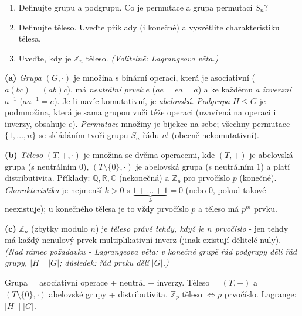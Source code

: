 \begin{zadani}
\begin{enumerate}[label=(\alph*)]
  \item {} Definujte grupu a podgrupu. Co je permutace a grupa permutací $S_n$?
  \item {} Definujte těleso. Uveďte příklady (i konečné) a vysvětlite charakteristiku tělesa.
  \item {} Uveďte, kdy je $\mathbb{Z}_n$ těleso. \emph{(Volitelně: Lagrangeova věta.)}
\end{enumerate}
\end{zadani}

\begin{reseni}
\textbf{(a)} \emph{Grupa} $(G,\cdot)$ je množina s binární operací, která je asociativní ($a(bc)=(ab)c$), má \emph{neutrální prvek} $e$ ($ae=ea=a$) a ke každému $a$ \emph{inverzní} $a^{-1}$ ($aa^{-1}=e$). Je-li navíc komutativní, je \emph{abelovská}. \emph{Podgrupa} $H\le G$ je podmnožina, která je sama grupou vuči téže operaci (uzavřená na operaci i inverzy, obsahuje $e$). \emph{Permutace} množiny je bijekce na sebe; všechny permutace $\{1,\dots,n\}$ se skládáním tvoří grupu $S_n$ řádu $n!$ (obecně nekomutativní).

\textbf{(b)} \emph{Těleso} $(T,+,\cdot)$ je množina se dvěma operacemi, kde $(T,+)$ je abelovská grupa (s neutrálním $0$), $(T\setminus\{0\},\cdot)$ je abelovská grupa (s neutrálním $1$) a platí distributivita. Příklady: $\mathbb{Q},\mathbb{R},\mathbb{C}$ (nekonečná) a $\mathbb{Z}_p$ pro prvočíslo $p$ (konečné). \emph{Charakteristika} je nejmenší $k>0$ s $\underbrace{1+\dots+1}_{k}=0$ (nebo $0$, pokud takové neexistuje); u konečného tělesa je to vždy prvočíslo $p$ a těleso má $p^m$ prvku.

\textbf{(c)} $\mathbb{Z}_n$ (zbytky modulo $n$) je \emph{těleso právě tehdy, když je $n$ prvočíslo} - jen tehdy má každý nenulový prvek multiplikativní inverz (jinak existují dělitelé nuly). \emph{(Nad rámec požadavku - Lagrangeova věta: v konečné grupě řád podgrupy dělí řád grupy, $|H|\mid|G|$; důsledek: řád prvku dělí $|G|$.)}
\end{reseni}

\begin{jadro}
Grupa = asociativní operace + neutrál + inverzy. Těleso = $(T,+)$ a $(T\setminus\{0\},\cdot)$ abelovské grupy + distributivita. $\mathbb{Z}_p$ těleso $\iff p$ prvočíslo. Lagrange: $|H|\mid|G|$.
\end{jadro}

